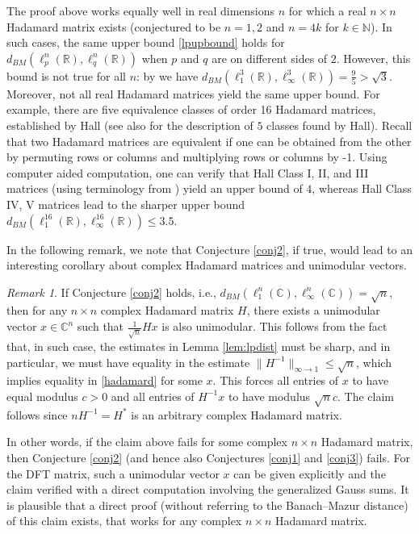 \documentclass[12pt, a4paper]{article}
\theoremstyle{plain} %
\theoremstyle{definition} %
\theoremstyle{remark} %
\newtheorem{remark}[theorem]{Remark}
\begin{document}
The proof above works equally well in real dimensions $n$ for which a real $n \times n$ Hadamard matrix exists (conjectured to be $n=1, 2$ and $n=4k$ for $k \in \mathbb{N}$). In such cases, the same upper bound \eqref{lpupbound} holds for $d_{BM}(\ell_p^n(\mathbb{R}), \ell_q^n(\mathbb{R}))$ when $p$ and $q$ are on different sides of $2$. However, this bound is not true for all $n$: by \cite{kobosvarivoda} we have $d_{BM}(\ell_1^3(\mathbb{R}), \ell_{\infty}^3(\mathbb{R})) = \frac{9}{5} > \sqrt{3}$. Moreover, not all real Hadamard matrices yield the same upper bound. For example, there are five equivalence classes of order 16 Hadamard matrices, established by Hall \cite{hall} (see also \cite[pp.~419--421]{wallis} for the description of $5$ classes found by Hall). Recall that two Hadamard matrices are equivalent if one can be obtained from the other by permuting rows or columns and multiplying rows or columns by -1. Using computer aided computation, one can verify that Hall Class I, II, and III matrices (using terminology from \cite{wallis}) yield an upper bound of $4$, whereas Hall Class IV, V matrices lead to the sharper upper bound $d_{BM}(\ell_1^{16}(\mathbb{R}), \ell_{\infty}^{16}(\mathbb{R})) \leq 3.5$.

In the following remark, we note that Conjecture \ref{conj2}, if true, would lead to an interesting corollary about complex Hadamard matrices and unimodular vectors.


\begin{remark}
If Conjecture \ref{conj2} holds, i.e., $d_{BM}(\ell_1^n(\mathbb{C}), \ell_{\infty}^n(\mathbb{C})) = \sqrt{n}$, then for any $n \times n$ complex Hadamard matrix $H$, there exists a unimodular vector $x \in \mathbb{C}^n$ such that $\frac{1}{\sqrt{n}} H x$ is also unimodular. This follows from the fact that, in such case, the estimates in Lemma \ref{lem:lpdist} must be sharp, and in particular, we must have equality in the estimate $\|H^{-1}\|_{\infty \to 1} \leq \sqrt{n}$, which implies equality in \eqref{hadamard} for some $x$. This forces all entries of $x$ to have equal modulus $c > 0$ and all entries of $H^{-1} x$ to have modulus $\sqrt{n} c$. The claim follows since $n H^{-1} = H^*$ is an arbitrary complex Hadamard matrix.
\end{remark}

In other words, if the claim above fails for some complex $n \times n$ Hadamard matrix, then Conjecture \ref{conj2} (and hence also Conjectures \ref{conj1} and \ref{conj3}) fails. For the DFT matrix, such a unimodular vector $x$ can be given explicitly and the claim verified with a direct computation involving the generalized Gauss sums. It is plausible that a direct proof (without referring to the Banach--Mazur distance) of this claim exists, that works for any complex $n \times n$ Hadamard matrix.
\end{document}
